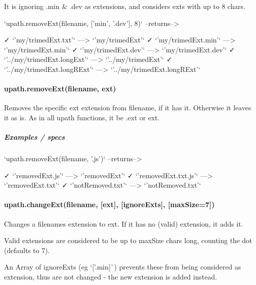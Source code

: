 It is ignoring {\ttfamily .min} \& {\ttfamily .dev} as extensions, and considers exts with up to 8 chars. \begin{DoxyVerb}`upath.removeExt(filename, ['min', '.dev'], 8)`          --returns-->

      ✓ `'my/trimedExt.txt'`              --->                  `'my/trimedExt'`
      ✓ `'my/trimedExt.min'`              --->              `'my/trimedExt.min'`
      ✓ `'my/trimedExt.dev'`              --->              `'my/trimedExt.dev'`
      ✓ `'../my/trimedExt.longExt'`       --->               `'../my/trimedExt'`
      ✓ `'../my/trimedExt.longRExt'`      --->      `'../my/trimedExt.longRExt'`
\end{DoxyVerb}


\paragraph*{{\ttfamily upath.\+remove\+Ext(filename, ext)}}

Removes the specific {\ttfamily ext} extension from filename, if it has it. Otherwise it leaves it as is. As in all upath functions, it be {\ttfamily .ext} or {\ttfamily ext}.

\subparagraph*{Examples / specs}

\begin{DoxyVerb}`upath.removeExt(filename, '.js')`          --returns-->

    ✓ `'removedExt.js'`          --->          `'removedExt'`
    ✓ `'removedExt.txt.js'`      --->      `'removedExt.txt'`
    ✓ `'notRemoved.txt'`         --->      `'notRemoved.txt'`
\end{DoxyVerb}


\paragraph*{{\ttfamily upath.\+change\+Ext(filename, \mbox{[}ext\mbox{]}, \mbox{[}ignore\+Exts\mbox{]}, \mbox{[}max\+Size=7\mbox{]})}}

Changes a filename\textquotesingle{}s extension to {\ttfamily ext}. If it has no (valid) extension, it adds it.


\begin{DoxyItemize}
\item Valid extensions are considered to be up to {\ttfamily max\+Size} chars long, counting the dot (defaults to 7).
\item An {\ttfamily Array} of {\ttfamily ignore\+Exts} (eg `\mbox{[}'.min\textquotesingle{}\mbox{]}\`{}) prevents these from being considered as extension, thus are not changed -\/ the new extension is added instead.
\end{DoxyItemize}

